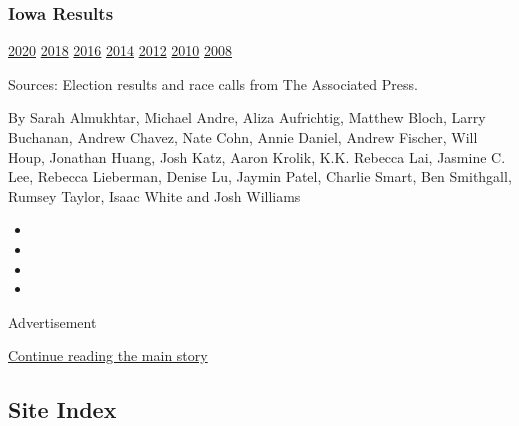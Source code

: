 \hypertarget{iowa-results}{%
\subsubsection{Iowa Results}\label{iowa-results}}

\href{https://www.nytimes.com/interactive/2020/02/04/us/elections/results-iowa-caucus.html?action=click\&module=ELEX_results\&pgtype=Interactive\&region=PastResultsFooter}{2020}
\href{https://www.nytimes.com/interactive/2018/11/06/us/elections/results-iowa-elections.html?action=click\&module=ELEX_results\&pgtype=Interactive\&region=PastResultsFooter}{2018}
\href{https://www.nytimes.com/elections/2016/results/iowa?action=click\&module=ELEX_results\&pgtype=Interactive\&region=PastResultsFooter}{2016}
\href{https://www.nytimes.com/elections/2014/iowa-elections?action=click\&module=ELEX_results\&pgtype=Interactive\&region=PastResultsFooter}{2014}
\href{https://www.nytimes.com/elections/2012/results/states/iowa.html?action=click\&module=ELEX_results\&pgtype=Interactive\&region=PastResultsFooter}{2012}
\href{https://www.nytimes.com/elections/2010/results/iowa.html?action=click\&module=ELEX_results\&pgtype=Interactive\&region=PastResultsFooter}{2010}
\href{https://www.nytimes.com/elections/2008/results/states/iowa.html?action=click\&module=ELEX_results\&pgtype=Interactive\&region=PastResultsFooter}{2008}

Sources: Election results and race calls from The Associated Press.

By Sarah Almukhtar, Michael Andre, Aliza Aufrichtig, Matthew Bloch,
Larry Buchanan, Andrew Chavez, Nate Cohn, Annie Daniel, Andrew Fischer,
Will Houp, Jonathan Huang, Josh Katz, Aaron Krolik, K.K. Rebecca Lai,
Jasmine C. Lee, Rebecca Lieberman, Denise Lu, Jaymin Patel, Charlie
Smart, Ben Smithgall, Rumsey Taylor, Isaac White and Josh Williams

\begin{itemize}
\item
\item
\item
\item
\end{itemize}

Advertisement

\protect\hyperlink{after-bottom}{Continue reading the main story}

\hypertarget{site-index}{%
\subsection{Site Index}\label{site-index}}

